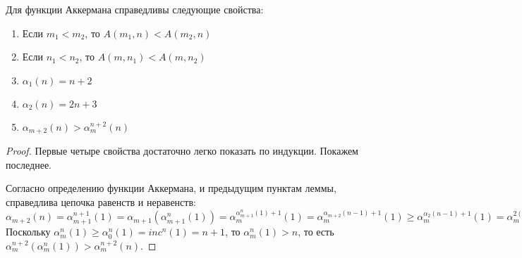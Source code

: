\begin{lemma}Для функции Аккермана справедливы следующие свойства:
\begin{enumerate}
\item Если $m_1 < m_2$, то $A(m_1,n) < A(m_2,n)$
\item Если $n_1 < n_2$, то $A(m,n_1) < A(m,n_2)$
\item $\alpha_1(n) = n+2$
\item $\alpha_2(n) = 2n+3$
\item $\alpha_{m+2}(n) > \alpha^{n+2}_m(n)$
\end{enumerate}
\end{lemma}

\begin{proof}
Первые четыре свойства достаточно легко показать по индукции. Покажем последнее.

Согласно определению функции Аккермана, и предыдущим пунктам леммы,
справедлива цепочка равенств и неравенств: 
$\alpha_{m+2}(n) = \alpha_{m+1}^{n+1}(1) = \alpha_{m+1}(\alpha_{m+1}^n(1)) =
\alpha_m^{\alpha_{m+1}^n(1)+1}(1) = \alpha_m^{\alpha_{m+2}(n-1)+1}(1)
\ge \alpha_m^{\alpha_2(n-1)+1}(1) = \alpha_m^{2(n-1)+3+1}(1) =
 \alpha_m^{n+n+2}(1) = \alpha_m^{n+2} (\alpha_m^{n}(1))$
%
Поскольку $\alpha_m^{n}(1) \ge \alpha_0^{n}(1) = inc^n(1) = n+1$, то
$\alpha_m^{n}(1) > n$, то есть $\alpha_m^{n+2} (\alpha_m^{n}(1)) > \alpha^{n+2}_m(n)$.

%


%


\end{proof}



